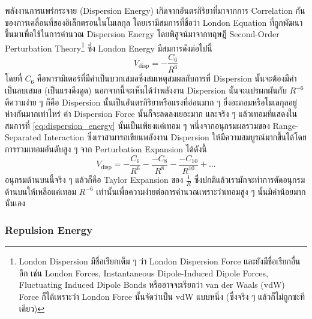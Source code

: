พลังงานการแพร่กระจาย (Dispersion Energy) เกิดจากอันตรกิริยาที่มาจากการ Correlation กันของการเคลื่อนที่ของอิเล็กตรอนในโมเลกุล โดยเรามีสมการที่ชื่อว่า London Equation ที่ถูกพัฒนาขึ้นมาเพื่อใช้ในการคำนวณ Dispersion Energy โดยพิสูจน์มาจากทฤษฎี Second-Order Perturbation Theory\footnote{London Dispersion มีชื่อเรียกเต็ม ๆ ว่า London Dispersion Force และยังมีชื่อเรียกอื่นอีก เช่น London Forces, Instantaneous Dipole-Induced Dipole Forces, Fluctuating Induced Dipole Bonds หรืออาจจะเรียกว่า van der Waals (vdW) Force ก็ได้เพราะว่า London Force นั้นจัดว่าเป็น vdW แบบหนึ่ง (ซึ่งจริง ๆ แล้วก็ไม่ถูกซะทีเดียว)} ซึ่ง London Energy มีสมการดังต่อไปนี้\autocite{eisenschitz1930,london1930,london1937}
%
\begin{equation}
  \label{eq:dispersion_energy}
  V_{\text{disp}}
  =
  - \frac{C_{6}}{R^{6}}
\end{equation}
%
โดยที่ $C_{6}$ คือพารามิเตอร์ที่มีค่าเป็นบวกเสมอซึ่งสมเหตุสมผลกับการที่ Dispersion นั้นจะต้องมีค่าเป็นลบเสมอ (เป็นแรงดึงดูด) นอกจากนี้จะเห็นได้ว่าพลังงาน Dispersion นั้นจะแปรผกผันกับ $R^{-6}$ ตีความง่าย ๆ ก็คือ Dispersion นั้นเป็นอันตรกิริยาหรือแรงที่อ่อนมาก ๆ ยิ่งอะตอมหรือโมเลกุลอยู่ห่างกันมากเท่าไหร่ ค่า Dispersion Force นั้นก็จะลดลงเยอะมาก และจริง ๆ แล้วเทอมที่แสดงในสมการที่ \eqref{eq:dispersion_energy} นั้นเป็นเพียงแค่เทอม ๆ หนึ่งจากอนุกรมผลรวมของ Range-Separated Interaction ซึ่งเราสามารถเขียนพลังงาน Dispersion ให้มีความสมบูรณ์มากขึ้นได้โดยการรวมเทอมอันดับสูง ๆ จาก Perturbation Expansion ได้ดังนี้
%
\begin{equation}
  \label{eq:dispersion_energy_expansion}
  V_{\text{disp}}
  =
  - \frac{C_{6}}{R^{6}}
  - \frac{-C_{8}}{R^{8}}
  - \frac{-C_{10}}{R^{10}}
  + \dots
\end{equation}
%
อนุกรมด้านบนนี้จริง ๆ แล้วก็คือ Taylor Expansion ของ $\frac{1}{R}$ ซึ่งปกติแล้วเรามักจะทำการตัดอนุกรมด้านบนให้เหลือแค่เทอม $R^{-6}$ เท่านั้นเพื่อความง่ายต่อการคำนวณเพราะว่าเทอมสูง ๆ นั้นมีค่าน้อยมากนั่นเอง

\subsubsection{Repulsion Energy}

